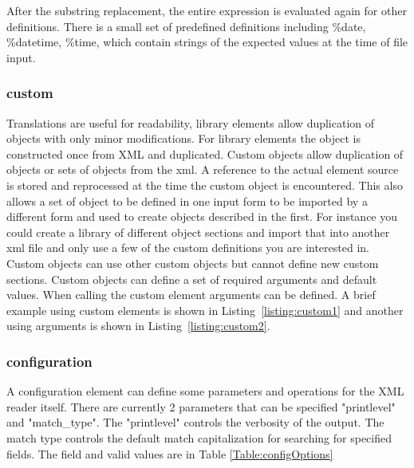 \documentclass[12pt]{article} %
\begin{document}
 After the substring replacement, the entire expression is evaluated again for other definitions.  There is a small set of predefined definitions including \%date, \%datetime, \%time, which contain strings of the expected values at the time of file input.

 \subsubsection{custom}
 Translations are useful for readability, library elements allow duplication of objects with only minor modifications.  For library elements the object is constructed once from XML and duplicated.  Custom objects allow duplication of objects or sets of objects from the xml.  A reference to the actual element source is stored and reprocessed at the time the custom object is encountered. This also allows a set of object to be defined in one input form to be imported by a different form and used to create objects described in the first.  For instance you could create a library of different object sections and import that into another xml file and only use a few of the custom definitions you are interested in.  Custom objects can use other custom objects but cannot define new custom sections.   Custom objects can define a set of required arguments and default values.  When calling the custom element arguments can be defined.
  A brief example using custom elements is shown in Listing~\ref{listing:custom1} and another using arguments is shown in Listing~\ref{listing:custom2}.
 
 

 \subsubsection{configuration}
 A configuration element can define some parameters and operations for the XML reader itself.  There are currently 2 parameters that can be specified "printlevel" and "match\_type".  The "printlevel" controls the verbosity of the output.  The match type controls the default match capitalization for searching for specified fields.  The field and valid values are in Table \ref{Table:configOptions}
\end{document}
